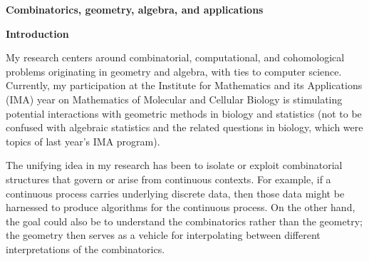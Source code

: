 \documentclass[11pt]{proposal}
\begin{document}



\mbox{}

\vspace{-4.3ex}
\centerline{\Large\bf Combinatorics, geometry, algebra, and applications}


{}%


\bigskip
\noindent
{\Large\bf Introduction}
\medskip


\label{s:intro}


\noindent
My research centers around combinatorial, computational, and
cohomological problems originating in geometry and algebra, with ties
to computer science.  Currently, my participation at the Institute for
Mathematics and its Applications (IMA) year on Mathematics of
Molecular and Cellular Biology is stimulating potential interactions
with geometric methods in biology and statistics (not to be confused
with algebraic statistics and the related questions in biology, which
were topics of last year's IMA program).

The unifying idea in my research has been to isolate or exploit
combinatorial structures that govern or arise from continuous
contexts.  For example, if a continuous process carries underlying
discrete data, then those data might be harnessed to produce
algorithms for the continuous process.  On the other hand, the goal
could also be to understand the combinatorics rather than the
geometry; the geometry then serves as a vehicle for interpolating
between different interpretations of the combinatorics.
\end{document}
